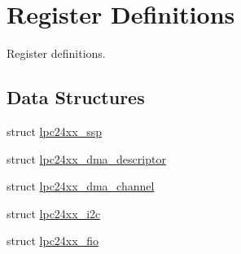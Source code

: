 \hypertarget{group__lpc24xx__regs}{}\section{Register Definitions}
\label{group__lpc24xx__regs}


Register definitions.  


\subsection*{Data Structures}
\begin{DoxyCompactItemize}
\item 
struct \mbox{\hyperlink{structlpc24xx__ssp}{lpc24xx\+\_\+ssp}}
\item 
struct \mbox{\hyperlink{structlpc24xx__dma__descriptor}{lpc24xx\+\_\+dma\+\_\+descriptor}}
\item 
struct \mbox{\hyperlink{structlpc24xx__dma__channel}{lpc24xx\+\_\+dma\+\_\+channel}}
\item 
struct \mbox{\hyperlink{structlpc24xx__i2c}{lpc24xx\+\_\+i2c}}
\item 
struct \mbox{\hyperlink{structlpc24xx__fio}{lpc24xx\+\_\+fio}}
\end{DoxyCompactItemize}
